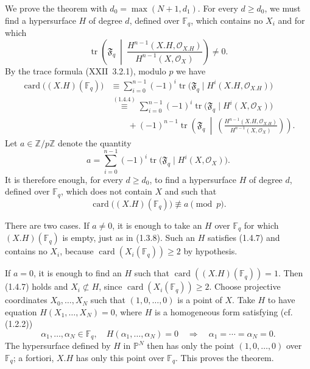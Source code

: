 We prove the theorem with $d_0=\max(N+1,d_1)$.  For every $d\geq d_0$,
we must find a hypersurface $H$ of degree $d$, defined over $\mathbb F_q$,
which contains no $X_i$ and for which
\begin{equation}\tag{1.4.5}
\operatorname{tr}\!\left(\mathfrak F_q\ \middle|\
\frac{H^{n-1}(X.H,\mathcal O_{X.H})}
     {H^{n-1}(X,\mathcal O_X)}\right)\ne0.
\end{equation}
By the trace formula (XXII~3.2.1), modulo $p$ we have
\begin{equation}\tag{1.4.6}
\begin{aligned}
\operatorname{card}\bigl((X.H)(\mathbb F_q)\bigr)
&\equiv\sum_{i=0}^{n-1}(-1)^i
 \operatorname{tr}\bigl(\mathfrak F_q\mid
 H^i(X.H,\mathcal O_{X.H})\bigr)\\
&\stackrel{(1.4.4)}{\equiv}
 \sum_{i=0}^{n-1}(-1)^i
 \operatorname{tr}\bigl(\mathfrak F_q\mid H^i(X,\mathcal O_X)\bigr)\\
&\qquad+(-1)^{n-1}\operatorname{tr}\!\left(\mathfrak F_q\ \middle|\
 \left(\frac{H^{n-1}(X.H,\mathcal O_{X.H})}
      {H^{n-1}(X,\mathcal O_X)}\right)\right).
\end{aligned}
\end{equation}
Let $a\in\mathbb Z/p\mathbb Z$ denote the quantity
\[
a=\sum_{i=0}^{n-1}(-1)^i
\operatorname{tr}\bigl(\mathfrak F_q\mid H^i(X,\mathcal O_X)\bigr).
\]
It is therefore enough, for every $d\geq d_0$, to find a hypersurface $H$
of degree $d$, defined over $\mathbb F_q$, which does not contain $X$ and
such that
\begin{equation}\tag{1.4.7}
\operatorname{card}\bigl((X.H)(\mathbb F_q)\bigr)\not\equiv a\pmod p.
\end{equation}

There are two cases.  If $a\ne0$, it is enough to take an $H$ over
$\mathbb F_q$ for which $(X.H)(\mathbb F_q)$ is empty, just as in (1.3.8).
Such an $H$ satisfies (1.4.7) and contains no $X_i$, because
$\operatorname{card}(X_i(\mathbb F_q))\geq2$ by hypothesis.

If $a=0$, it is enough to find an $H$ such that
$\operatorname{card}((X.H)(\mathbb F_q))=1$.  Then (1.4.7) holds and
$X_i\not\subset H$, since $\operatorname{card}(X_i(\mathbb F_q))\geq2$.
Choose projective coordinates $X_0,\dots,X_N$ such that $(1,0,\dots,0)$ is
a point of $X$.  Take $H$ to have equation $H(X_1,\dots,X_N)=0$, where $H$
is a homogeneous form satisfying (cf. (1.2.2))
\begin{equation}\tag{1.4.8}
\alpha_1,\dots,\alpha_N\in\mathbb F_q,\quad
H(\alpha_1,\dots,\alpha_N)=0
\quad\Longrightarrow\quad
\alpha_1=\cdots=\alpha_N=0.
\end{equation}
The hypersurface defined by $H$ in $\mathbb P^N$ then has only the point
$(1,0,\dots,0)$ over $\mathbb F_q$; a fortiori, $X.H$ has only this point
over $\mathbb F_q$.  This proves the theorem.

